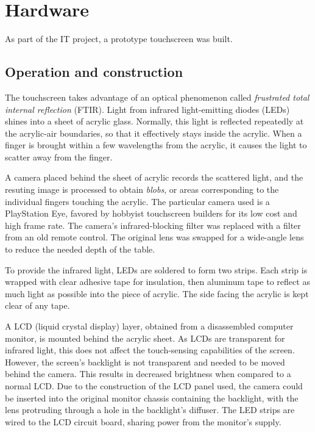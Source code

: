 \documentclass[a4paper,12pt]{article}
\begin{document}
\section{Hardware}
\label{hw}

As part of the IT project, a prototype touchscreen was built.

\subsection{Operation and construction}

The touchscreen takes advantage of an optical phenomenon called
\emph{frustrated total internal reflection} (FTIR).
Light from infrared light-emitting diodes (LEDs) shines into a sheet of acrylic
glass.
Normally, this light is reflected repeatedly at the acrylic-air boundaries, so
that it effectively stays inside the acrylic.
When a finger is brought within a few wavelengths from the acrylic, it causes
the light to scatter away from the finger.

A camera placed behind the sheet of acrylic records the scattered light, and
the resuting image is processed to obtain \emph{blobs}, or areas corresponding
to the individual fingers touching the acrylic.
The particular camera used is a PlayStation Eye, favored by hobbyist
touchscreen builders for its low cost and high frame rate. %
The camera's infrared-blocking filter was replaced with a filter from an old
remote control.
The original lens was swapped for a wide-angle lens to reduce the needed depth
of the table.

To provide the infrared light, LEDs are soldered to form two strips.
Each strip is wrapped with clear adhesive tape for insulation, then aluminum
tape to reflect as much light as possible into the piece of acrylic.
The side facing the acrylic is kept clear of any tape.

A LCD (liquid crystal display) layer, obtained from a disassembled computer
monitor, is mounted behind the acrylic sheet.
As LCDs are transparent for infrared light, this does not affect the
touch-sensing capabilities of the screen.
However, the screen's backlight is not transparent and needed to be moved
behind the camera.
This results in decreased brightness when compared to a normal LCD.
Due to the construction of the LCD panel used, the camera could be inserted
into the original monitor chassis containing the backlight, with the lens
protruding through a hole in the backlight's diffuser.
The LED strips are wired to the LCD circuit board, sharing power from the
monitor's supply.
\end{document}
